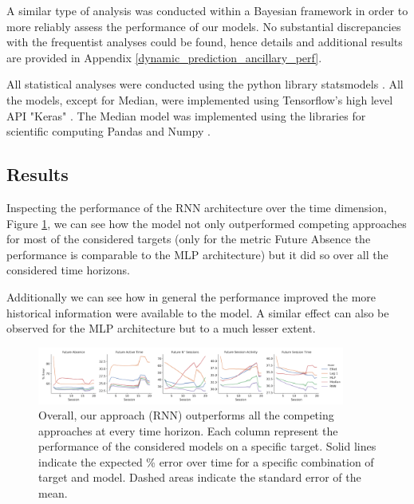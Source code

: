 A similar type of analysis was conducted within a Bayesian framework in order to more reliably assess the performance of our models. No substantial discrepancies with the frequentist analyses could be found, hence details and additional results are provided in Appendix \ref{dynamic_prediction_ancillary_perf}. 

All statistical analyses were conducted using the python library statsmodels \cite{seabold2010statsmodels}.  All the models, except for Median, were implemented using Tensorflow's high level API "Keras" \cite{tensorflow2015-whitepaper,chollet2015keras}. The Median model was implemented using the libraries for scientific computing Pandas and Numpy \cite{reback2020pandas,harris2020array}.

\subsection{Results}
\label{results_2}
Inspecting the performance of the RNN architecture over the time dimension, Figure \ref{model_comp_coll_game_32}, we can see how the model not only outperformed competing approaches for most of the considered targets (only for the metric Future Absence the performance is comparable to the MLP architecture) but it did so over all the considered time horizons. 

Additionally we can see how in general the performance improved the more historical information were available to the model. A similar effect can also be observed for the MLP architecture but to a much lesser extent.

\begin{figure}[h]
\centering
\includegraphics[width=0.9\textwidth]{images/chapter_3/models_comparison_collapsed_game_32.png}
\caption[\textbf{Model comparison collapsing over game context}]{ Overall, our approach (RNN) outperforms all the competing approaches at every time horizon. Each column represent the performance of the considered models on a specific target. Solid lines indicate the expected \% error over time for a specific combination of target and model. Dashed areas indicate the standard error of the mean.}
\label{model_comp_coll_game_32}
\end{figure}

